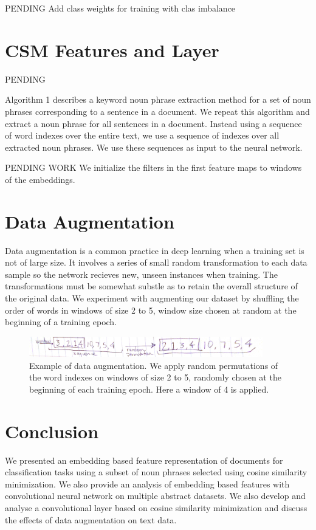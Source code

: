 \documentclass[12pt]{article}
\begin{document}
PENDING
Add class weights for training with clas imbalance

\section{CSM Features and Layer}

PENDING

Algorithm 1 describes a keyword noun phrase extraction method for a set of noun phrases corresponding to a sentence in a document. We repeat this
algorithm and extract a noun phrase for all sentences in a document. Instead using a sequence of word indexes over the entire text, we use a sequence
of indexes over all extracted noun phrases. We use these sequences as input to the neural network.

PENDING WORK
We initialize the filters in the first feature maps to windows of the embeddings.

\section{Data Augmentation}
Data augmentation is a common practice in deep learning when a training set is not of large size. It involves a series of small random
transformation to each data sample so the network recieves new, unseen instances when training. The transformations must be somewhat substle
as to retain the overall structure of the original data. We experiment with augmenting our dataset by shuffling the order of words in windows of size 2 to
5, window size chosen at random at the beginning of a training epoch.

\begin{figure}[H]
\centering
\includegraphics[height=.5in, width=4in]{Images/data_augmentation.jpg}
\caption{Example of data augmentation. We apply random permutations of the word indexes on windows of size 2 to 5, randomly chosen at the beginning of
each training epoch. Here a window of 4 is applied.}
\end{figure}


\section{Conclusion}
We presented an embedding based feature representation of documents for classification tasks using a subset of noun phrases selected using cosine
similarity minimization. We also provide an analysis of embedding based features with convolutional neural network on multiple abstract datasets.
We also develop and analyse a convolutional layer based on cosine similarity minimization and discuss the effects of data augmentation on text data.
\end{document}
